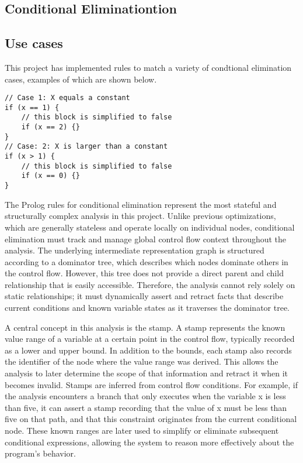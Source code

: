 \subsection{Conditional Eliminationtion}
\subsection*{Use cases}
This project has implemented rules to match a variety of condtional elimination cases, examples of which are shown below.
\smallbreak

\begin{lstlisting}
// Case 1: X equals a constant
if (x == 1) {
    // this block is simplified to false
    if (x == 2) {}
}
// Case: 2: X is larger than a constant
if (x > 1) {
    // this block is simplified to false
    if (x == 0) {}
}
\end{lstlisting}

The Prolog rules for conditional elimination represent the most stateful and structurally complex analysis in this project. Unlike previous optimizations, which are generally stateless and operate locally on individual nodes, conditional elimination must track and manage global control flow context throughout the analysis. The underlying intermediate representation graph is structured according to a dominator tree, which describes which nodes dominate others in the control flow. However, this tree does not provide a direct parent and child relationship that is easily accessible. Therefore, the analysis cannot rely solely on static relationships; it must dynamically assert and retract facts that describe current conditions and known variable states as it traverses the dominator tree.

A central concept in this analysis is the stamp. A stamp represents the known value range of a variable at a certain point in the control flow, typically recorded as a lower and upper bound. In addition to the bounds, each stamp also records the identifier of the node where the value range was derived. This allows the analysis to later determine the scope of that information and retract it when it becomes invalid. Stamps are inferred from control flow conditions. For example, if the analysis encounters a branch that only executes when the variable x is less than five, it can assert a stamp recording that the value of x must be less than five on that path, and that this constraint originates from the current conditional node. These known ranges are later used to simplify or eliminate subsequent conditional expressions, allowing the system to reason more effectively about the program’s behavior.

